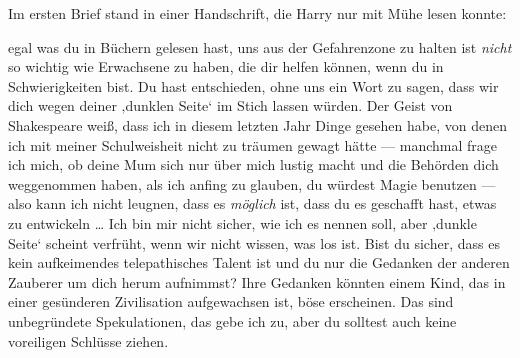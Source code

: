 Im ersten Brief stand in einer Handschrift, die Harry nur mit Mühe lesen konnte:

\begin{writtenNote}

egal was du in Büchern gelesen hast, uns aus der Gefahrenzone zu halten ist \emph{nicht} so wichtig wie Erwachsene zu haben, die dir helfen können, wenn du in Schwierigkeiten bist. Du hast entschieden, ohne uns ein Wort zu sagen, dass wir dich wegen deiner ‚dunklen Seite‘ im Stich lassen würden. Der Geist von Shakespeare weiß, dass ich in diesem letzten Jahr Dinge gesehen habe, von denen ich mit meiner Schulweisheit nicht zu träumen gewagt hätte — manchmal frage ich mich, ob deine Mum sich nur über mich lustig macht und die Behörden dich weggenommen haben, als ich anfing zu glauben, du würdest Magie benutzen — also kann ich nicht leugnen, dass es \emph{möglich} ist, dass du es geschafft hast, etwas zu entwickeln … Ich bin mir nicht sicher, wie ich es nennen soll, aber ‚dunkle Seite‘ scheint verfrüht, wenn wir nicht wissen, was los ist. Bist du sicher, dass es kein aufkeimendes telepathisches Talent ist und du nur die Gedanken der anderen Zauberer um dich herum aufnimmst? Ihre Gedanken könnten einem Kind, das in einer gesünderen Zivilisation aufgewachsen ist, böse erscheinen. Das sind unbegründete Spekulationen, das gebe ich zu, aber du solltest auch keine voreiligen Schlüsse ziehen.


\end{writtenNote}

